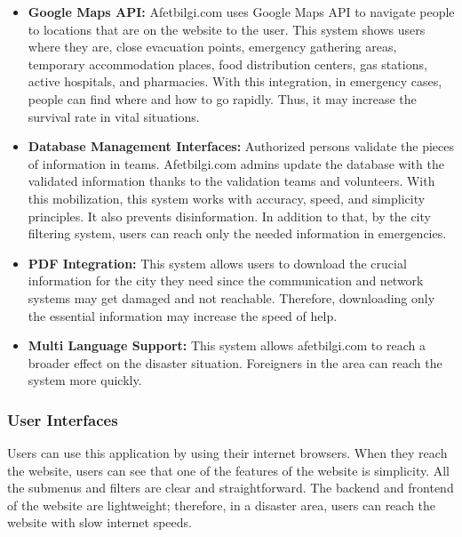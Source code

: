 \begin{itemize}
    \item \textbf{Google Maps API: } Afetbilgi.com uses Google Maps API to navigate people to locations that are on the website to the user. This system shows users where they are, close evacuation points, emergency gathering areas, temporary accommodation places, food distribution centers, gas stations, active hospitals, and pharmacies. With this integration, in emergency cases, people can find where and how to go rapidly. Thus, it may increase the survival rate in vital situations. 
    \item \textbf{Database Management Interfaces: } Authorized persons validate the pieces of information in teams. Afetbilgi.com admins update the database with the validated information thanks to the validation teams and volunteers. With this mobilization, this system works with accuracy, speed, and simplicity principles. It also prevents disinformation. In addition to that, by the city filtering system, users can reach only the needed information in emergencies. 
    \item \textbf{PDF Integration: } This system allows users to download the crucial information for the city they need since the communication and network systems may get damaged and not reachable. Therefore, downloading only the essential information may increase the speed of help.
    \item \textbf{Multi Language Support: } This system allows afetbilgi.com to reach a broader effect on the disaster situation. Foreigners in the area can reach the system more quickly.
\end{itemize}

\subsubsection{User Interfaces}

Users can use this application by using their internet browsers. When they reach the website, users can see that one of the features of the website is simplicity. All the submenus and filters are clear and straightforward. The backend and frontend of the website are lightweight; therefore, in a disaster area, users can reach the website with slow internet speeds.

